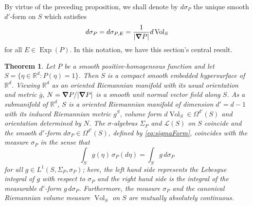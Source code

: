 \documentclass[11pt]{article}
\newtheorem{theorem}{Theorem}[section]
\theoremstyle{remark}
\newcommand\Exp{\operatorname{Exp}}
\newcommand{\Vol}{\operatorname{Vol}}
\begin{document}
\noindent By virtue of the preceding proposition, we shall denote by $d\sigma_P$ the unique smooth $d'$-form on $S$ which satisfies
\begin{equation}\label{eq:sigmaForm}
    d\sigma_P=d\sigma_{P,E}=\frac{1}{|\grad P|}d\Vol_S
\end{equation}
for all $E\in\Exp(P)$. In this notation, we have this section's central result.




\begin{theorem}\label{thm:RiemannLebesgue}
Let $P$ be a smooth positive-homogeneous function and let $S=\{\eta\in\mathbb{R}^d:P(\eta)=1\}$. Then $S$ is a compact smooth embedded hypersurface of $\mathbb{R}^d$. Viewing $\mathbb{R}^d$ as an oriented Riemannian manifold with its usual orientation and metric $\overline{g}$, $N=\grad P/|\grad P|$ is a smooth unit normal vector field along $S$. As a submanifold of $\mathbb{R}^d$, $S$ is a oriented Riemannian manifold of dimension $d'=d-1$ with its induced Riemannian metric $g^S$, volume form $d\Vol_S\in\Omega^{d'}(S)$ and orientation determined by $N$. The $\sigma$-algebras $\Sigma_P$ and $\mathcal{L}(S)$ on $S$ coincide and the smooth $d'$-form $d\sigma_P\in\Omega^{d'}(S)$, defined by \eqref{eq:sigmaForm}, coincides with the measure $\sigma_P$ in the sense that
\begin{equation}\label{eq:FormsAndMeasures}
\int_S g(\eta)\,\sigma_P(d\eta)=\int_S g\,d\sigma_P
\end{equation}
for all $g\in L^1(S,\Sigma_P,\sigma_P)$; here, the left hand side represents the Lebesgue integral of $g$ with respect to $\sigma_P$ and the right hand side is the integral of the measurable $d'$-form $g\, d\sigma_P$. Furthermore, the measure $\sigma_P$ and the canonical Riemannian volume measure $\Vol_S$ on $S$ are mutually absolutely continuous.
\end{theorem} 
\end{document}
